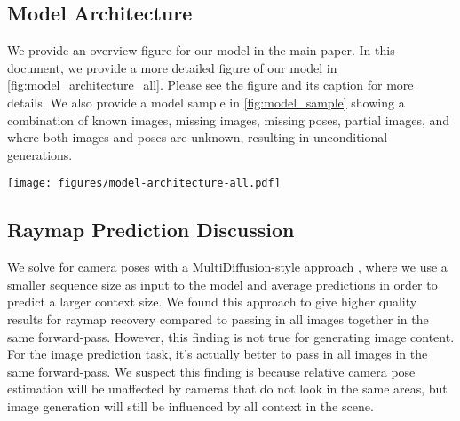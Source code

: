 \subsection{Model Architecture}

We provide an overview figure for our model in the main paper.
In this document, we provide a more detailed figure of our model in \cref{fig:model_architecture_all}.
Please see the figure and its caption for more details.
We also provide a model sample in \cref{fig:model_sample} showing a combination of known images, missing images, missing poses, partial images, and where both images and poses are unknown, resulting in unconditional generations.

\begin{figure*}[t]
\centering
\texttt{[image: figures/model-architecture-all.pdf]}
\caption{\label{fig:model_architecture_all}%
    \textbf{\method{} model architecture.}
    Here we show the full model architecture from input (top) to output (bottom).
    We use the same notation as the main paper, where $I$ denotes images, $R$ denotes raymaps, and $\mathcal{M}$ denotes masks indicating where we know information or not.
    We inject various conditioning time and text conditioning into the model, as shown on the sides of the transformer.
    Timestep conditioning is necessary because our model is a diffusion transformer.
    Text, however, is optional.
    We include it to jointly train on our single-view image collection, which has text annotations, whereas the multi-view sequences are always trained with an empty string as the text prompt.
    The ``Ada LayerNorm Continuous'' is normalization with scale and shift modulation from the continuous time conditioning.
}
\vspace{10em}
\end{figure*}


\subsection{Raymap Prediction Discussion}

We solve for camera poses with a MultiDiffusion-style approach \cite{muller2024multidiff,weber2024nerfiller}, where we use a smaller sequence size as input to the model and average predictions in order to predict a larger context size.
We found this approach to give higher quality results for raymap recovery compared to passing in all images together in the same forward-pass.
However, this finding is not true for generating image content.
For the image prediction task, it's actually better to pass in all images in the same forward-pass.
We suspect this finding is because relative camera pose estimation will be unaffected by cameras that do not look in the same areas, but image generation will still be influenced by all context in the scene.

